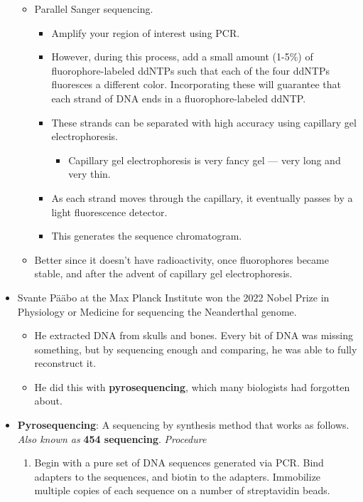 \documentclass[../notes.tex]{subfiles}
\begin{document}
\begin{itemize}
\begin{itemize}
\begin{itemize}
        \end{itemize}
        \item Parallel Sanger sequencing.
        \begin{itemize}
            \item Amplify your region of interest using PCR.
            \item However, during this process, add a small amount (1-5\%) of fluorophore-labeled ddNTPs such that each of the four ddNTPs fluoresces a different color. Incorporating these will guarantee that each strand of DNA ends in a fluorophore-labeled ddNTP.
            \item These strands can be separated with high accuracy using capillary gel electrophoresis.
            \begin{itemize}
                \item Capillary gel electrophoresis is very fancy gel --- very long and very thin.
            \end{itemize}
            \item As each strand moves through the capillary, it eventually passes by a light fluorescence detector.
            \item This generates the sequence chromatogram.
        \end{itemize}
        \item Better since it doesn't have radioactivity, once fluorophores became stable, and after the advent of capillary gel electrophoresis.
    \end{itemize}
    \item Svante P\"{a}\"{a}bo at the Max Planck Institute won the 2022 Nobel Prize in Physiology or Medicine for sequencing the Neanderthal genome.
    \begin{itemize}
        \item He extracted DNA from skulls and bones. Every bit of DNA was missing something, but by sequencing enough and comparing, he was able to fully reconstruct it.
        \item He did this with \textbf{pyrosequencing}, which many biologists had forgotten about.
    \end{itemize}
    \item \textbf{Pyrosequencing}: A sequencing by synthesis method that works as follows. \emph{Also known as} \textbf{454 sequencing}. \emph{Procedure}
    \begin{enumerate}
        \item Begin with a pure set of DNA sequences generated via PCR. Bind adapters to the sequences, and biotin to the adapters. Immobilize multiple copies of each sequence on a number of streptavidin beads.

\end{enumerate}
\end{itemize}
\end{document}
